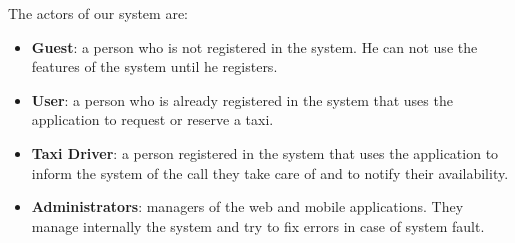 The actors of our system are:
\begin{itemize}
	\item \textbf{Guest}: a person who is not registered in the system. He can not use the features of the system until he registers. 
	\item \textbf{User}: a person who is already registered in the system that uses the application to request or reserve a taxi.
	\item \textbf{Taxi Driver}: a person registered in the system that uses the application to inform the system of the call they take care of and to notify their availability.
	\item \textbf{Administrators}: managers of the web and mobile applications. They manage internally the system and try to fix errors in case of system fault.
\end{itemize}
